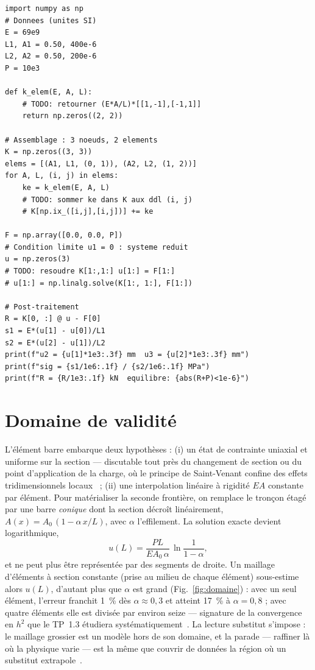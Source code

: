 \documentclass[10pt,journal]{IEEEtran}
\begin{document}
\begin{lstlisting}[caption={Squelette du solveur barre en Python / numpy. Completer les TODO puis comparer au Tableau~\ref{tab:res}.},label={lst:py},float=!t]
import numpy as np
# Donnees (unites SI)
E = 69e9
L1, A1 = 0.50, 400e-6
L2, A2 = 0.50, 200e-6
P = 10e3

def k_elem(E, A, L):
    # TODO: retourner (E*A/L)*[[1,-1],[-1,1]]
    return np.zeros((2, 2))

# Assemblage : 3 noeuds, 2 elements
K = np.zeros((3, 3))
elems = [(A1, L1, (0, 1)), (A2, L2, (1, 2))]
for A, L, (i, j) in elems:
    ke = k_elem(E, A, L)
    # TODO: sommer ke dans K aux ddl (i, j)
    # K[np.ix_([i,j],[i,j])] += ke

F = np.array([0.0, 0.0, P])
# Condition limite u1 = 0 : systeme reduit
u = np.zeros(3)
# TODO: resoudre K[1:,1:] u[1:] = F[1:]
# u[1:] = np.linalg.solve(K[1:, 1:], F[1:])

# Post-traitement
R = K[0, :] @ u - F[0]
s1 = E*(u[1] - u[0])/L1
s2 = E*(u[2] - u[1])/L2
print(f"u2 = {u[1]*1e3:.3f} mm  u3 = {u[2]*1e3:.3f} mm")
print(f"sig = {s1/1e6:.1f} / {s2/1e6:.1f} MPa")
print(f"R = {R/1e3:.1f} kN  equilibre: {abs(R+P)<1e-6}")
\end{lstlisting}

\section{Domaine de validité}
\label{sec:domaine}
L'élément barre embarque deux hypothèses : (i) un état de contrainte uniaxial et uniforme sur la section --- discutable tout près du changement de section ou du point d'application de la charge, où le principe de Saint-Venant confine des effets tridimensionnels locaux~\cite{gere} ; (ii) une interpolation linéaire à rigidité $EA$ constante par élément. Pour matérialiser la seconde frontière, on remplace le tronçon étagé par une barre \emph{conique} dont la section décroît linéairement, $A(x) = A_0\,(1-\alpha\,x/L)$, avec $\alpha$ l'effilement. La solution exacte devient logarithmique,
\begin{equation}
u(L) = \frac{PL}{EA_0\,\alpha}\,\ln\!\frac{1}{1-\alpha},
\label{eq:conique}
\end{equation}
et ne peut plus être représentée par des segments de droite. Un maillage d'éléments à section constante (prise au milieu de chaque élément) sous-estime alors $u(L)$, d'autant plus que $\alpha$ est grand (Fig.~\ref{fig:domaine}) : avec un seul élément, l'erreur franchit 1~\% dès $\alpha\approx 0{,}3$ et atteint 17~\% à $\alpha=0{,}8$ ; avec quatre éléments elle est divisée par environ seize --- signature de la convergence en $h^2$ que le TP~1.3 étudiera systématiquement~\cite{zienkiewicz}. La lecture \og substitut\fg{} s'impose : le maillage grossier est un modèle hors de son domaine, et la parade --- raffiner là où la physique varie --- est la même que couvrir de données la région où un substitut extrapole~\cite{forrester}.
\end{document}
